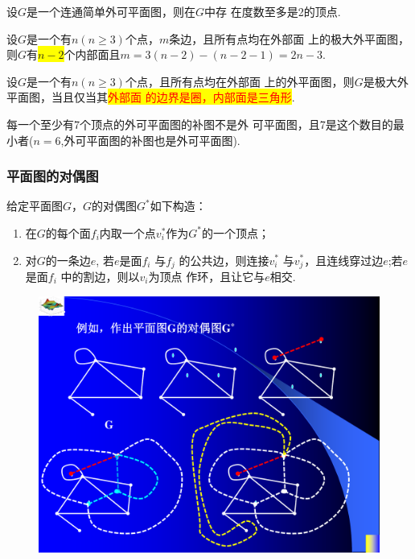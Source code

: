 \begin{lemma}
	设$G$是一个连通简单外可平面图，则在$G$中存
	在度数至多是2的顶点.
\end{lemma}
\begin{theorem}
设$G$是一个有$n (n\geq 3)$个点，$m$条边，且所有点均在外部面
上的极大外平面图，则$G$有\colorbox{yellow}{$n-2$}个内部面且$m=3(n-2)-(n-2-1)=2n-3$.
\end{theorem}

\begin{theorem}
设$G$是一个有$n (n\geq 3)$个点，且所有点均在外部面
上的外平面图，则$G$是极大外平面图，当且仅当其\colorbox{yellow}{\textcolor{red}{外部面
的边界是圈，内部面是三角形}}.
\end{theorem}

\begin{theorem}
每一个至少有7个顶点的外可平面图的补图不是外
可平面图，且7是这个数目的最小者($n=6$,外可平面图的补图也是外可平面图).
\end{theorem}



\subsubsection{平面图的对偶图}
\begin{definition}
	给定平面图$G$，$G$的对偶图$G^{*}$如下构造：
	\begin{enumerate}
		\item 在$G$的每个面$f_i$内取一个点$v_i^{*}$作为$G^{*}$的一个顶点；
		\item 对$G$的一条边$e$, 若$e$是面$f_i$ 与$f_j$ 的公共边，则连接$v_i^{*}$
		与$v_j^{*}$，且连线穿过边$e$;若$e$是面$f_i$ 中的割边，则以$v_i$为顶点
		作环，且让它与$e$相交.
	\end{enumerate}
\end{definition}
\begin{figure}[H]
	\small
	\centering 
	\includegraphics[scale=0.4]{image/CH6_duiou.pdf}  
	\label{fikgkjjj1Kjk}  
\end{figure}


